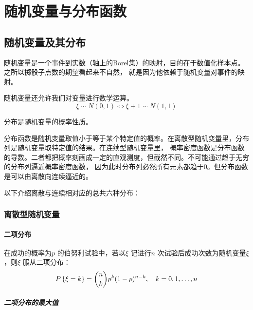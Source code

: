 \chapter{随机变量与分布函数}
\section{随机变量及其分布}
随机变量是一个事件到实数（轴上的Borel集）的映射，目的在于数值化样本点。之所以掷骰子点数的期望看起来不自然，
就是因为他依赖于随机变量对事件的映射。

随机变量还允许我们对变量进行数学运算。\[
    \xi \sim N(0,1) \iff \xi+1 \sim N(1,1)
\]

分布是随机变量的概率性质。

分布函数是随机变量取值小于等于某个特定值的概率。在离散型随机变量里，分布列是随机变量取特定值的结果。在连续型随机变量里，
概率密度函数是分布函数的导数。二者都把概率刻画成一定的直观测度，但截然不同。不可能通过趋于无穷的分布列逼近概率密度函数，
因为此时分布列必然所有元素都趋于0。但分布函数是可以由离散向连续逼近的。

以下介绍离散与连续相对应的总共六种分布：

\subsection{离散型随机变量}

\subsubsection{二项分布}
\begin{definition}[二项分布]
    在成功的概率为\(p\) 的伯努利试验中，若以\(\xi\) 记进行\(n\)
    次试验后成功次数为随机变量\(\xi\)，则\(\xi\) 服从二项分布：
    \[
        \P{\xi=k} = \binom{n}{k} p^{k} (1-p)^{n-k}, \quad k=0,1,\ldots,n
    \]
\end{definition}

\paragraph{二项分布的最大值}

